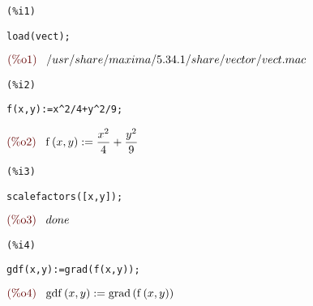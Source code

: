 \documentclass{article}
\begin{document}
\noindent
\begin{minipage}[t]{8ex}{\color{red}\bf
\begin{verbatim}
(%i1) 
\end{verbatim}}
\end{minipage}
\begin{minipage}[t]{\textwidth}{\color{blue}
\begin{verbatim}
load(vect);
\end{verbatim}}
\end{minipage}
\begin{math}\displaystyle
\parbox{8ex}{\color{labelcolor}(\%o1) }
/usr/share/maxima/5.34.1/share/vector/vect.mac
\end{math}


\noindent
\begin{minipage}[t]{8ex}{\color{red}\bf
\begin{verbatim}
(%i2) 
\end{verbatim}}
\end{minipage}
\begin{minipage}[t]{\textwidth}{\color{blue}
\begin{verbatim}
f(x,y):=x^2/4+y^2/9;
\end{verbatim}}
\end{minipage}
\begin{math}\displaystyle
\parbox{8ex}{\color{labelcolor}(\%o2) }
\mathrm{f}\left( x,y\right) :=\frac{{x}^{2}}{4}+\frac{{y}^{2}}{9}
\end{math}


\noindent
\begin{minipage}[t]{8ex}{\color{red}\bf
\begin{verbatim}
(%i3) 
\end{verbatim}}
\end{minipage}
\begin{minipage}[t]{\textwidth}{\color{blue}
\begin{verbatim}
scalefactors([x,y]);
\end{verbatim}}
\end{minipage}
\begin{math}\displaystyle
\parbox{8ex}{\color{labelcolor}(\%o3) }
done
\end{math}


\noindent
\begin{minipage}[t]{8ex}{\color{red}\bf
\begin{verbatim}
(%i4) 
\end{verbatim}}
\end{minipage}
\begin{minipage}[t]{\textwidth}{\color{blue}
\begin{verbatim}
gdf(x,y):=grad(f(x,y));
\end{verbatim}}
\end{minipage}
\begin{math}\displaystyle
\parbox{8ex}{\color{labelcolor}(\%o4) }
\mathrm{gdf}\left( x,y\right) :=\mathrm{grad}\left( \mathrm{f}\left( x,y\right) \right) 
\end{math}
\end{document}

